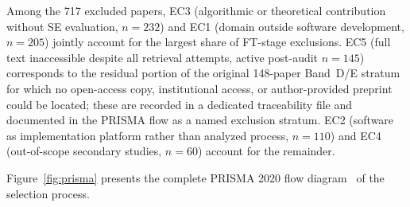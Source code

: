 Among the 717 excluded papers, EC3 (algorithmic or theoretical contribution
without SE evaluation, $n=232$) and EC1 (domain outside software development,
$n=205$) jointly account for the largest share of FT-stage exclusions. EC5
(full text inaccessible despite all retrieval attempts, active post-audit
$n=145$) corresponds to the residual portion of the original 148-paper
Band~D/E stratum for which no open-access copy, institutional access, or
author-provided preprint could be located; these are recorded in a dedicated
traceability file and documented in the PRISMA flow as a named exclusion
stratum. EC2 (software as implementation platform rather than
analyzed process, $n=110$) and EC4 (out-of-scope secondary studies, $n=60$)
account for the remainder.

Figure~\ref{fig:prisma} presents the complete PRISMA 2020 flow
diagram~\cite{page2021} of the selection process.

